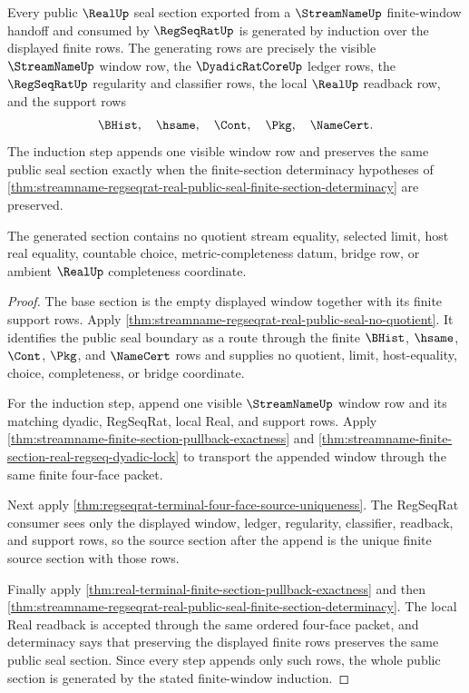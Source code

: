 \begin{theorem}
\label{thm:streamname-regseqrat-real-public-seal-window-induction}
Every public $\RealUp$ seal section exported from a $\StreamNameUp$
finite-window handoff and consumed by $\RegSeqRatUp$ is generated by induction
over the displayed finite rows. The generating rows are precisely the visible
$\StreamNameUp$ window row, the $\DyadicRatCoreUp$ ledger rows, the
$\RegSeqRatUp$ regularity and classifier rows, the local $\RealUp$ readback
row, and the support rows
$$
\BHist,\quad \hsame,\quad \Cont,\quad \Pkg,\quad \NameCert.
$$
The induction step appends one visible window row and preserves the same
public seal section exactly when the finite-section determinacy hypotheses of
\autoref{thm:streamname-regseqrat-real-public-seal-finite-section-determinacy}
are preserved.

The generated section contains no quotient stream equality, selected limit,
host real equality, countable choice, metric-completeness datum, bridge row, or
ambient $\RealUp$ completeness coordinate.
\end{theorem}
\begin{proof}
The base section is the empty displayed window together with its finite support
rows. Apply
\autoref{thm:streamname-regseqrat-real-public-seal-no-quotient}. It identifies
the public seal boundary as a route through the finite $\BHist$, $\hsame$,
$\Cont$, $\Pkg$, and $\NameCert$ rows and supplies no quotient, limit,
host-equality, choice, completeness, or bridge coordinate.

For the induction step, append one visible $\StreamNameUp$ window row and its
matching dyadic, RegSeqRat, local Real, and support rows. Apply
\autoref{thm:streamname-finite-section-pullback-exactness} and
\autoref{thm:streamname-finite-section-real-regseq-dyadic-lock} to transport
the appended window through the same finite four-face packet.

Next apply \autoref{thm:regseqrat-terminal-four-face-source-uniqueness}. The
RegSeqRat consumer sees only the displayed window, ledger, regularity,
classifier, readback, and support rows, so the source section after the append
is the unique finite source section with those rows.

Finally apply
\autoref{thm:real-terminal-finite-section-pullback-exactness} and then
\autoref{thm:streamname-regseqrat-real-public-seal-finite-section-determinacy}.
The local Real readback is accepted through the same ordered four-face packet,
and determinacy says that preserving the displayed finite rows preserves the
same public seal section. Since every step appends only such rows, the whole
public section is generated by the stated finite-window induction.
\end{proof}

